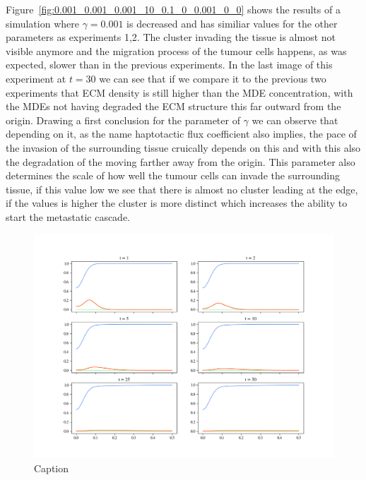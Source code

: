 Figure~\ref{fig:0.001_0.001_0.001_10_0.1_0_0.001_0_0} shows the results of a simulation where $\gamma = 0.001$ is decreased and has similiar values for the other parameters as experiments 1,2. The cluster invading the tissue is almost not visible anymore and the migration process of the tumour cells happens, as was expected, slower than in the previous experiments. In the last image of this experiment at $t = 30$ we can see that if we compare it to the previous two experiments that ECM density is still higher than the MDE concentration, with the MDEs not having degraded the ECM structure this far outward from the origin. \newline
Drawing a first conclusion for the parameter of $\gamma$ we can observe that depending on it, as the name haptotactic flux coefficient also implies, the pace of the invasion of the surrounding tissue cruically depends on this and with this also the degradation of the moving farther away from the origin. This parameter also determines the scale of how well the tumour cells can invade the surrounding tissue, if this value low we see that there is almost no cluster leading at the edge, if the values is higher the cluster is more distinct which increases the ability to start the metastatic cascade.\newline
\begin{figure}
    \centering
    \includegraphics[width=\textwidth]{resources/images/0.001_0.001_0.001_10_0.1_0.5_0.005_0_0.png}
    \caption{Caption}
    \label{fig:0.001_0.001_0.001_10_0.1_0.5_0.005_0_0}
\end{figure}
